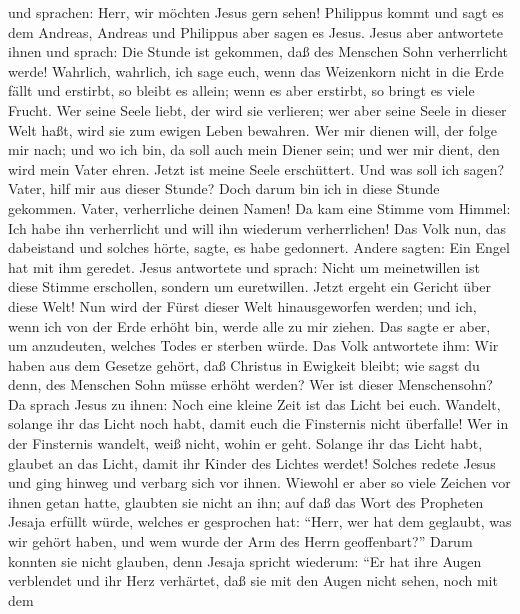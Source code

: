 und sprachen: Herr, wir möchten Jesus gern sehen! 
Philippus kommt und sagt es dem Andreas, Andreas und Philippus aber
sagen es Jesus.  Jesus aber antwortete ihnen und sprach:
Die Stunde ist gekommen, daß des Menschen Sohn verherrlicht werde!
 Wahrlich, wahrlich, ich sage euch, wenn das Weizenkorn
nicht in die Erde fällt und erstirbt, so bleibt es allein; wenn es aber
erstirbt, so bringt es viele Frucht.  Wer seine Seele
liebt, der wird sie verlieren; wer aber seine Seele in dieser Welt haßt,
wird sie zum ewigen Leben bewahren.  Wer mir dienen will,
der folge mir nach; und wo ich bin, da soll auch mein Diener sein; und
wer mir dient, den wird mein Vater ehren.  Jetzt ist
meine Seele erschüttert. Und was soll ich sagen? Vater, hilf mir aus
dieser Stunde? Doch darum bin ich in diese Stunde gekommen.
 Vater, verherrliche deinen Namen! Da kam eine Stimme vom
Himmel: Ich habe ihn verherrlicht und will ihn wiederum verherrlichen!
 Das Volk nun, das dabeistand und solches hörte, sagte,
es habe gedonnert. Andere sagten: Ein Engel hat mit ihm geredet.
 Jesus antwortete und sprach: Nicht um meinetwillen ist
diese Stimme erschollen, sondern um euretwillen.  Jetzt
ergeht ein Gericht über diese Welt! Nun wird der Fürst dieser Welt
hinausgeworfen werden;  und ich, wenn ich von der Erde
erhöht bin, werde alle zu mir ziehen.  Das sagte er aber,
um anzudeuten, welches Todes er sterben würde.  Das Volk
antwortete ihm: Wir haben aus dem Gesetze gehört, daß Christus in
Ewigkeit bleibt; wie sagst du denn, des Menschen Sohn müsse erhöht
werden? Wer ist dieser Menschensohn?  Da sprach Jesus zu
ihnen: Noch eine kleine Zeit ist das Licht bei euch. Wandelt, solange
ihr das Licht noch habt, damit euch die Finsternis nicht überfalle! Wer
in der Finsternis wandelt, weiß nicht, wohin er geht. 
Solange ihr das Licht habt, glaubet an das Licht, damit ihr Kinder des
Lichtes werdet!  Solches redete Jesus und ging hinweg und
verbarg sich vor ihnen. Wiewohl er aber so viele Zeichen vor ihnen getan
hatte, glaubten sie nicht an ihn;  auf daß das Wort des
Propheten Jesaja erfüllt würde, welches er gesprochen hat: ``Herr, wer
hat dem geglaubt, was wir gehört haben, und wem wurde der Arm des Herrn
geoffenbart?''  Darum konnten sie nicht glauben, denn
Jesaja spricht wiederum:  ``Er hat ihre Augen verblendet
und ihr Herz verhärtet, daß sie mit den Augen nicht sehen, noch mit dem
